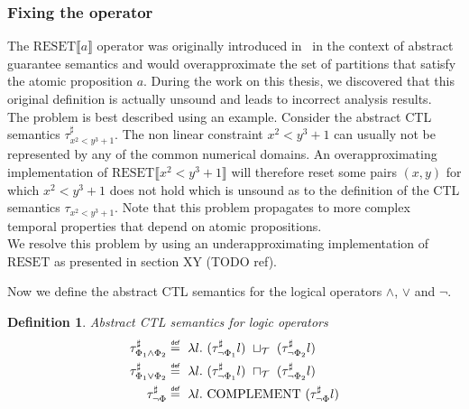 \documentclass[11pt,a4paper,titlepage]{article}
\newtheorem{definition}{Definition}[section]
\newcommand\eqdef{\mathrel{\overset{\makebox[0pt]{\mbox{\normalfont\tiny\sffamily def}}}{=}}}
\begin{document}
\begin{tcolorbox}
    \subsubsection*{Fixing the  operator}
    The $\text{RESET}\llbracket a \rrbracket$ operator was originally introduced in~\cite{UrbanPhd} in the context of abstract guarantee semantics
    and would overapproximate the set of partitions that satisfy the atomic proposition $a$. 
    During the work on this thesis, we discovered that this original definition is actually unsound and leads to incorrect analysis results. \\
    
    The problem is best described using an example. Consider the abstract CTL semantics $\tau^{\sharp}_{x^2 < y^3 + 1}$. 
    The non linear constraint $x^2 < y^3 + 1$ can usually not be represented by any of the common numerical domains. 
    An overapproximating implementation of $\text{RESET}\llbracket x^2 < y^3 + 1 \rrbracket$ will therefore
    reset some pairs $(x, y)$ for which $x^2 < y^3 + 1$ does not hold which is unsound as to the definition of
    the CTL semantics $\tau_{x^2 < y^3 + 1}$. Note that this problem propagates to more complex temporal properties that
    depend on atomic propositions.\\

    We resolve this problem by using an underapproximating implementation of $\text{RESET}$ as presented
    in section XY (TODO ref).
\end{tcolorbox}

Now we define the abstract CTL semantics for the logical operators $\land$, $\lor$ and $\neg$.

\begin{definition}\label{def:abstract_ctl_semantics_logic_operators}
    Abstract CTL semantics for logic operators
    \begin{align}
        \tau^{\sharp}_{\Phi_1 \land \Phi_2} &\eqdef \ \lambda l. \ (\tau^{\sharp}_{\neg \Phi_1}l) \ \sqcup_{\mathcal{T}} \ (\tau^{\sharp}_{\neg \Phi_2}l)
        \label{eq:abstract_ctl_and}\\
        \tau^{\sharp}_{\Phi_1 \lor \Phi_2} &\eqdef \ \lambda l. \ (\tau^{\sharp}_{\neg \Phi_1}l) \ \sqcap_{\mathcal{T}} \ (\tau^{\sharp}_{\neg \Phi_2}l)
        \label{eq:abstract_ctl_or}\\
        \tau^{\sharp}_{\neg \Phi} &\eqdef \ \lambda l. \ \text{COMPLEMENT} \ (\tau^{\sharp}_{\neg \Phi}l)
        \label{eq:abstract_ctl_not}
    \end{align}
\end{definition}
\end{document}
